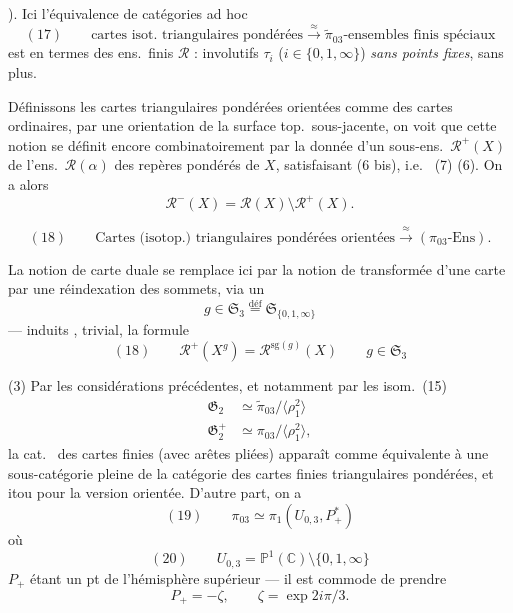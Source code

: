 \documentclass[11pt,a4paper]{article}
\begin{document}

). Ici l'équivalence de catégories ad hoc
\[
  (17)\qquad \text{cartes isot.\ triangulaires pondérées} \xrightarrow{\ \approx\ } \tilde\pi_{03}\text{-ensembles finis spéciaux}
\]
est en termes des ens.\ finis $\mathcal{R}$ : \ill{} involutifs $\tau_{i}$ ($i \in \{0, 1, \infty\}$) \emph{sans points fixes}, sans plus.

Définissons les cartes triangulaires pondérées orientées comme des cartes ordinaires, par une orientation de la surface top.\ sous-jacente, on voit que cette notion se définit encore combinatoirement par la donnée d'un sous-ens.\ $\mathcal{R}^{+}(X)$ de l'ens.\ $\mathcal{R}(\alpha)$ des repères pondérés de $X$, satisfaisant (6 bis), i.e.\  (7) \ill{} \ill{} (6). On a alors
\[
  \mathcal{R}^{-}(X) = \mathcal{R}(X) \setminus \mathcal{R}^{+}(X) .
\]

\[
  (18)\qquad \text{Cartes (isotop.) triangulaires pondérées orientées} \xrightarrow{\ \approx\ } (\pi_{03}\text{-Ens}) .
\]


La notion de \og carte duale \fg{} se remplace ici par la notion de transformée d'une carte par une \og réindexation \fg{} des sommets, via un
\[
  g \in \mathfrak{S}_{3} \overset{\text{déf}}{=} \mathfrak{S}_{\{0, 1, \infty\}}
\]
--- \ill{} induits \ill{} \ill{},  trivial, \ill{} \ill{} \ill{} la formule
\[
  (18)\qquad \mathcal{R}^{+}(X^{g}) = \mathcal{R}^{\mathrm{sg}(g)}(X) \qquad g \in \mathfrak{S}_{3}
\]

(3) Par les considérations précédentes, et notamment par les isom.\ (15)
\begin{align*}
  \mathfrak{G}_{2} &\simeq \tilde\pi_{03}/\langle\rho_{1}^{2}\rangle \\
  \mathfrak{G}_{2}^{+} &\simeq \pi_{03}/\langle\rho_{1}^{2}\rangle ,
\end{align*}
la cat.\  des cartes finies (avec arêtes pliées) apparaît comme équivalente à une sous-catégorie pleine de la catégorie  des cartes finies triangulaires pondérées, et \ill{} itou pour la version orientée. D'autre part, on a
\[
  (19)\qquad \pi_{03} \simeq \pi_{1}(U_{0,3}, P_{+}^{*})
\]
où
\[
  (20)\qquad U_{0,3} = \mathbb{P}^{1}(\mathbb{C}) \setminus \{0, 1, \infty\}
\]
 $P_{+}$ étant un pt  de l'hémisphère supérieur --- il est commode de prendre
\[
  P_{+} = -\zeta, \qquad \zeta = \exp 2i\pi/3 .
\]
\end{document}
